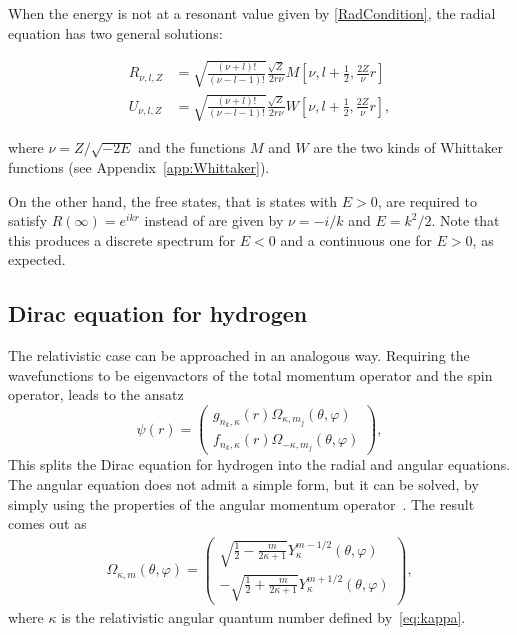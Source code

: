 When the energy is not at a resonant value given by \eqref{RadCondition}, the radial equation has two general solutions:
\begin{subeqeations}
\begin{align} \label{generalR}
   	R_{\nu,l,Z}&=\sqrt{\frac{(\nu+l)!}{(\nu-l-1)!}}\frac{\sqrt{Z}}{2 r \nu}M \left[\nu,l+\frac{1}{2},\frac{2Z}{\nu}r \right] \\
	U_{\nu,l,Z}&=\sqrt{\frac{(\nu+l)!}{(\nu-l-1)!}}\frac{\sqrt{Z}}{2 r \nu}W \left[\nu,l+\frac{1}{2},\frac{2Z}{\nu}r \right],
\end{align}
\end{subeqeations}
where $\nu = Z/\sqrt{-2E}$ and the functions $M$ and $W$ are the two kinds of Whittaker functions (see Appendix~\ref{app:Whittaker}).

On the other hand, the free states, that is states with $E>0$, are required to satisfy $R(\infty) = e^{i k r}$ instead of are given by $\nu = -i/k$ and $E=k^2/2$. Note that this produces a discrete spectrum for $E<0$ and a continuous one for $E>0$, as expected.

\subsection{Dirac equation for hydrogen}

The relativistic case can be approached in an analogous way. Requiring the wavefunctions to be eigenvactors of the total momentum operator and the spin operator, leads to the ansatz~\cite{flugge_practical_1971}
\begin{equation} \label{Diracwave}
	\psi(r) = \left(\begin{matrix}g_{n_k,\kappa}(r) \Omega_{\kappa,m_j}(\theta,\varphi) \\ f_{n_k,\kappa}(r) \Omega_{-\kappa,m_j}(\theta,\varphi)\end{matrix}\right),
\end{equation}
This splits the Dirac equation for hydrogen into the radial and angular equations. The angular equation does not admit a simple form, but it can be solved, by simply using the properties of the angular momentum operator~\cite{flugge_practical_1971}. The result comes out as
\begin{align}
  \Omega_{\kappa,m}
  (\theta,\varphi)= \left(
    \begin{array}{c}
      \sqrt{\frac{1}{2} - \frac{m}{2\kappa+1}}
      Y_\kappa^{m-1/2}(\theta,\varphi)
      \\
      -\sqrt{\frac{1}{2} + \frac{m}{2\kappa+1}}
      Y_\kappa^{m+1/2}(\theta,\varphi)
    \end{array}
  \right), \label{eq:29}
\end{align}
where $\kappa$ is the relativistic angular quantum number defined by~\eqref{eq:kappa}.


